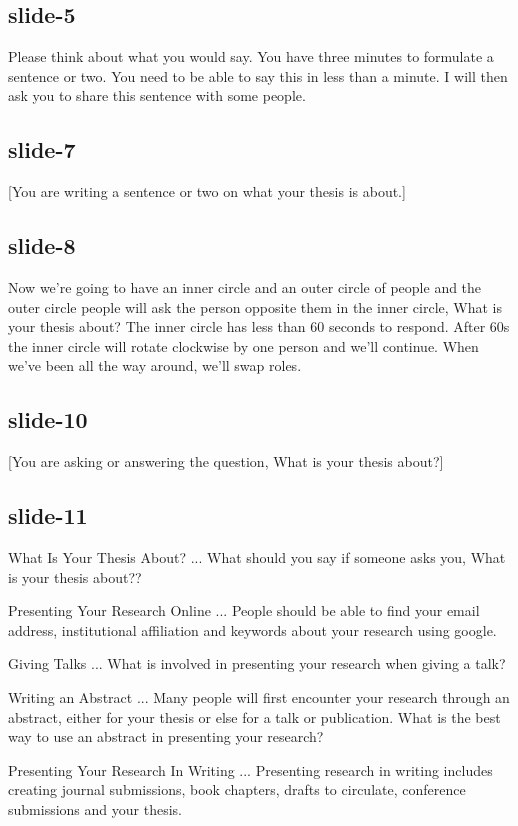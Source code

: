 \documentclass[12pt,\papersize]{extarticle}
\begin{document}
\subsection{slide-5}
Please think about what you would say.  You have three minutes to formulate a sentence or two.
You need to be able to say this in less than a minute.
I will then ask you to share this sentence with some people.
 
\subsection{slide-7}
[You are writing a sentence or two on what your thesis is about.]
 
\subsection{slide-8}
Now we're going to have an inner circle and an outer circle of people and the outer circle people
will ask the person opposite them in the inner circle, What is your thesis about?
The inner circle has less than 60 seconds to respond.
After 60s the inner circle will rotate clockwise by one person and we'll continue.
When we've been all the way around, we'll swap roles.
 
\subsection{slide-10}
[You are asking or answering the question, What is your thesis about?]
 
\subsection{slide-11}
What Is Your Thesis About?
... What should you say if someone asks you, What is your thesis about??
 
Presenting Your Research Online
... People should be able to find your email address, institutional affiliation and keywords about your research using google.
 
Giving Talks
... What is involved in presenting your research when giving a talk?
 
Writing an Abstract
... Many people will first encounter your research through an abstract, either for your thesis or else for a talk or publication.  What is the best way to use an abstract in presenting your research?
 
Presenting Your Research In Writing
... Presenting research in writing includes creating journal submissions, book chapters, drafts to circulate, conference submissions and your thesis.
 
\end{document}
